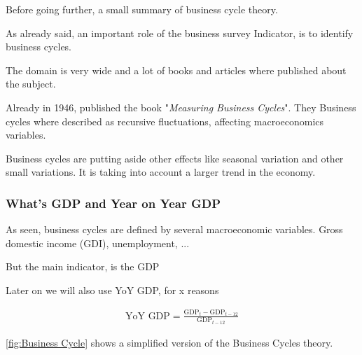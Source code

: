 \documentclass[12pt,a4paper,oneside]{book}
\begin{document}
Before going further, a small summary of business cycle theory. 

As already said, an important role of the business survey Indicator, is to identify business cycles.


The domain is very wide and a lot of books and articles where published about the subject. 

Already in 1946, \citeauthor{mitchell_measuring_1946} published the book "\textit{Measuring Business Cycles}". They 
Business cycles where described as recursive fluctuations, affecting macroeconomics variables.

Business cycles are putting aside other effects like seasonal variation and other small variations. It is taking into account a larger trend in the economy.

\subsubsection{What's GDP and Year on Year GDP}

As seen, business cycles are defined by several macroeconomic variables. 
Gross domestic income (GDI), unemployment, ...

But the main indicator, is the GDP

Later on we will also use YoY GDP, for x reasons

\begin{eqnarray}
   \mbox{YoY GDP} = \frac{\mbox{GDP}_t - \mbox{GDP}_{t-12}}{\mbox{GDP}_{t-12}} 
\end{eqnarray}

\autoref{fig:Business Cycle} shows a simplified version of the Business Cycles theory.
\end{document}
